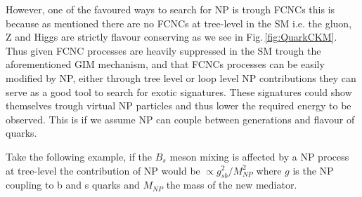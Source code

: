 However, one of the favoured ways to search for NP is trough FCNCs this is because as mentioned there are no FCNCs at tree-level in the SM i.e. the gluon, Z and Higgs are strictly flavour conserving as we see in Fig.\,\ref{fig:QuarkCKM}.  
%
Thus given FCNC processes are heavily suppressed in the SM trough the aforementioned GIM mechanism, and that FCNCs processes can be easily modified by NP, either through tree level or loop level NP contributions they can serve as a good tool to search for exotic signatures. 
%
These signatures could show themselves trough virtual NP particles and thus lower the required energy to be observed. 
%
This is if we assume NP can couple between generations and flavour of quarks. 

Take the following example, if the $B_s$ meson mixing is affected by a NP process at tree-level the contribution of NP would be $\propto g^2_{sb} / M^2_{NP} $ where $g$ is the NP coupling to b and s quarks and $M_{NP}$ the mass of the new mediator.


